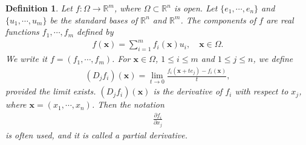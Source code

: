 \documentclass[10pt]{book}
\newtheorem{definition}{Definition}[chapter]
\theoremstyle{definition}
\numberwithin{equation}{chapter}
\begin{document}
\medskip

\begin{definition}
Let $f: \Omega \to \mathbb{R}^m$, where $\Omega \subset \mathbb{R}^n$ is open. Let $\{e_1, \cdots, e_n\}$ and $\{u_1, \cdots, u_m\}$ be the standard bases of $\mathbb{R}^n$ and $\mathbb{R}^m$. The components of $f$ are real functions $f_1, \cdots, f_m$ defined by
\begin{align*}
    f(\mathbf{x}) = \sum^m_{i=1} f_i(\mathbf{x}) u_i, \quad \mathbf{x} \in \Omega.
\end{align*}
We write it $f = (f_1, \cdots, f_m)$. For $\mathbf{x} \in \Omega$, $1 \leq i \leq m$ and $1 \leq j \leq n$, we define
\begin{align*}
    \left(D_jf_i\right)(\mathbf{x}) = \lim_{t\to 0} \frac{f_i(\mathbf{x} + te_j) - f_i(\mathbf{x})}{t},
\end{align*}
provided the limit exists. $\left(D_jf_i\right)(\mathbf{x})$ is the derivative of $f_i$ with respect to $x_j$, where $\mathbf{x} = (x_1, \cdots, x_n)$. Then the notation
\begin{align*}
    \frac{\partial f_i}{\partial x_j}
\end{align*}
is often used, and it is called a partial derivative.
\end{definition}

\medskip
\end{document}
